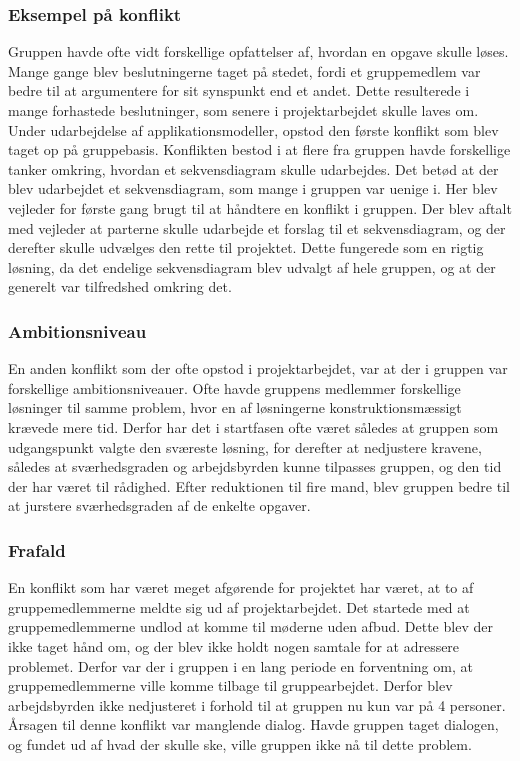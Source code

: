 \subsubsection{Eksempel på konflikt}
Gruppen havde ofte vidt forskellige opfattelser af, hvordan en opgave skulle løses. Mange gange blev beslutningerne taget på stedet, fordi et gruppemedlem var
 bedre til at argumentere for sit synspunkt end et andet. Dette resulterede i mange forhastede beslutninger, som senere i projektarbejdet skulle laves om. 
 Under udarbejdelse af applikationsmodeller, opstod den første konflikt som blev taget op på gruppebasis. Konflikten bestod i at flere fra gruppen havde 
forskellige tanker omkring, hvordan et sekvensdiagram skulle udarbejdes. Det betød at der blev udarbejdet et sekvensdiagram, som mange i gruppen var uenige i. 
Her blev vejleder for første gang brugt til at håndtere en konflikt i gruppen. Der blev aftalt med vejleder at parterne skulle udarbejde et forslag til 
et sekvensdiagram, og der derefter skulle udvælges den rette til projektet. Dette fungerede som en rigtig løsning, da det endelige sekvensdiagram blev udvalgt 
af hele gruppen, og at der generelt var tilfredshed omkring det.

\subsubsection{Ambitionsniveau}
En anden konflikt som der ofte opstod i projektarbejdet, var at der i gruppen var forskellige ambitionsniveauer. Ofte havde gruppens medlemmer forskellige 
løsninger til samme problem, hvor en af løsningerne konstruktionsmæssigt krævede mere tid. Derfor har det i startfasen ofte været således at gruppen som 
udgangspunkt 
valgte den sværeste løsning, for derefter at nedjustere kravene, således at sværhedsgraden og arbejdsbyrden kunne tilpasses gruppen, og den tid der har været 
til rådighed. Efter reduktionen til fire mand, blev gruppen bedre til at jurstere sværhedsgraden af de enkelte opgaver.    

\subsubsection{Frafald}
En konflikt som har været meget afgørende for projektet har været, at to af gruppemedlemmerne meldte sig ud af projektarbejdet. Det startede med at 
gruppemedlemmerne undlod at komme til møderne uden afbud. Dette blev der ikke taget hånd om, og der blev ikke holdt nogen samtale for at adressere problemet.
 Derfor var der i gruppen i en lang periode en forventning om, at gruppemedlemmerne ville komme tilbage til gruppearbejdet. Derfor blev 
 arbejdsbyrden ikke nedjusteret i forhold til at gruppen nu kun var på 4 personer. Årsagen til denne konflikt var manglende dialog. Havde gruppen taget 
 dialogen, og fundet ud af hvad der skulle ske, ville gruppen ikke nå til dette problem.

